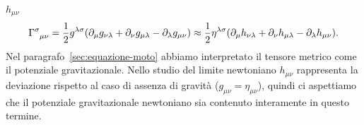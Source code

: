 $h_{\mu\nu}$
\begin{equation}
  \label{eq:christoffel-approx}
  \tensor{\Gamma}{^{\sigma}_{\mu\nu}} = \frac{1}{2}g^{\lambda\sigma}
  (\partial_{\mu}g_{\nu\lambda} + \partial_{\nu}g_{\mu\lambda}
  - \partial_{\lambda}g_{\mu\nu}) \approx \frac{1}{2}\eta^{\lambda\sigma}
  (\partial_{\mu}h_{\nu\lambda} + \partial_{\nu}h_{\mu\lambda}
  - \partial_{\lambda}h_{\mu\nu}).
\end{equation}
Nel paragrafo~\ref{sec:equazione-moto} abbiamo interpretato il tensore metrico
come il potenziale gravitazionale.  Nello studio del limite newtoniano
$h_{\mu\nu}$ rappresenta la deviazione rispetto al caso di assenza di gravità
($g_{\mu\nu} = \eta_{\mu\nu}$), quindi ci aspettiamo che il potenziale
gravitazionale newtoniano sia contenuto interamente in questo termine.

